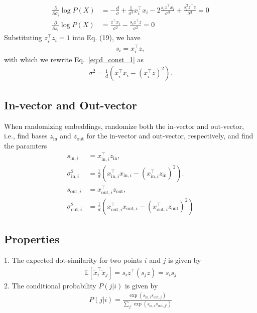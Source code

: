 \documentclass[12pt]{article} %
\begin{document}
\begin{align}
\frac{\partial}{\partial \sigma_i } \log P(X) &=
-\frac{d}{\sigma} + \frac{1}{\sigma^3}x_i^\top x_i -2 \frac{s_i z^\top x_i}{\sigma^3} + \frac{s_i ^2 z^\top z}{\sigma^3} = 0 \label{eq:d_const_1} \\
\frac{\partial}{\partial s_i } \log P(X) &= \frac{z^\top x_i}{\sigma^2} - \frac{s_i z^\top z}{\sigma^2} = 0 \label{eq:d_const_2}
\end{align}
Substituting $z_i^\top z_i = 1$ into Eq. (19), we have
\begin{align}
s_i = x_i ^\top z,
\end{align}
with which we rewrite Eq.~\eqref{eq:d_const_1} as
\begin{align}
\sigma^2 = \frac{1}{d}\left(x_i^\top x_i -(x_i ^\top z)^2\right).
\end{align}

\subsection{In-vector and Out-vector}
When randomizing embeddings, randomize both the in-vector and out-vector, i.e., find bases $z_{\text{in}}$ and $z_{\text{out}}$ for the in-vector and out-vector, respectively, and find the paramters
\begin{align}
s_{\text{in},i} &= x_{\text{in}, i} ^\top z_{\text{in}}, \\
\sigma^2 _{\text{in}, i} &= \frac{1}{d}\left(x_{\text{in}, i}^\top x_{\text{in}, i} -(x_{\text{in}, i} ^\top z_{\text{in}})^2\right). \\
s_{\text{out},i} &= x_{\text{out}, i} ^\top z_{\text{out}}, \\
\sigma^2 _{\text{out}, i} &= \frac{1}{d}\left(x_{\text{out}, i}^\top x_{\text{out}, i} -(x_{\text{out}, i} ^\top z_{\text{out}})^2\right)
\end{align}


\subsection{Properties}
1. The expected dot-similarity for two points $i$ and $j$ is given by
\begin{align}
\mathbb{E}[\tilde x_i^\top \tilde x_j] = s_i z^\top (s_j z) = s_i s_j
\end{align}
2. The conditional probability $P(j \vert i)$ is given by
\begin{align}
P(j \vert i) = \frac{\exp(s_{\text{in}, i}s_{\text{out}, j})}{\sum_{j'}\exp(s_{\text{in},i}s_{\text{out}, j'})}
\end{align}
\end{document}

